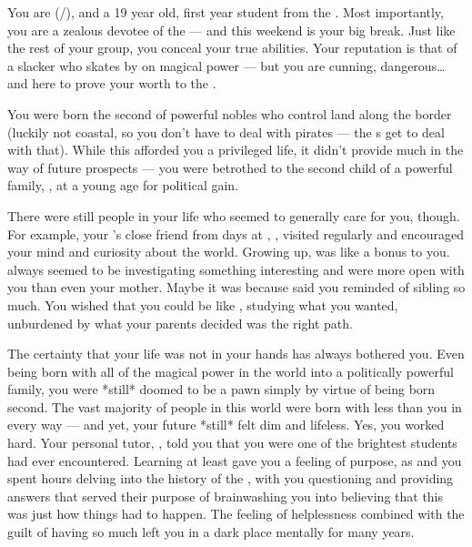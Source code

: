 \documentclass[char]{GL2020}
\begin{document}
\name{\cChupStudent{}}
 
You are \cChupStudent{\full} (\cChupStudent{\they}/\cChupStudent{\them}), and a 19 year old, first year student from the \pFarm{}. Most importantly, you are a zealous devotee of the \pGoaties{} — and this weekend is your big break. Just like the rest of your group, you conceal your true abilities. Your reputation is that of a slacker who skates by on \cChupStudent{\their} magical power — but you are cunning, dangerous\ldots and here to prove your worth to the \pGoaties{}.
 
You were born the second \cChupStudent{\offspring} of powerful nobles who control land along the \pTech{} border (luckily not coastal, so you don't have to deal with pirates — the \cWildCard{\formal}s get to deal with that). While this afforded you a privileged life, it didn't provide much in the way of future prospects — you were betrothed to the second child of a powerful \pTech{} family, \cHeir{\full}, at a young age for political gain. 

There were still people in your life who seemed to generally care for you, though. For example, your \cWildCardFriend{\parent}’s close friend from \cWildCardFriend{\their} days at \pSchool{}, \cWildCard{}, visited regularly and encouraged your mind and curiosity about the world. Growing up, \cWildCard{} was like a bonus \cWildCard{\auncle} to you. \cWildCard{\They} always seemed to be investigating something interesting and were more open with you than even your mother. Maybe it was because  \cWildCard{\they} said you reminded \cWildCard{\them} of \cWildCard{\their} sibling so much. You wished that you could be like \cWildCard{\them}, studying what you wanted, unburdened by what your parents decided was the right path.

The certainty that your life was not in your hands has always bothered you. Even being born with all of the magical power in the world into a politically powerful family, you were *still* doomed to be a pawn simply by virtue of being born second. The vast majority of people in this world were born with less than you in every way — and yet, your future *still* felt dim and lifeless. Yes, you worked hard. Your personal tutor, \cHistory{\full}, told you that you were one of the brightest students \cHistory{\they} had ever encountered. Learning at least gave you a feeling of purpose, as \cHistory{} and you spent hours delving into the history of the \pFarm{}, with you questioning and \cHistory{\them} providing answers that served their purpose of brainwashing you into believing that this was just how things had to happen. The feeling of helplessness combined with the guilt of having so much left you in a dark place mentally for many years.  
 
\end{document}
